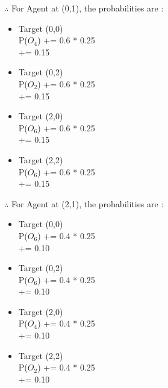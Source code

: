 \documentclass[10pt,letterpaper]{article}
\begin{document}
\noindent$\therefore$ For Agent at (0,1), the probabilities are :
\begin{itemize}
    \item Target (0,0)\\ \hspace*{23pt} P($O_4$) += 0.6 * 0.25\\ \hspace*{52pt} += 0.15
    \item Target (0,2)\\ \hspace*{23pt} P($O_2$) += 0.6 * 0.25\\ \hspace*{52pt} += 0.15
    \item Target (2,0)\\ \hspace*{23pt} P($O_6$) += 0.6 * 0.25\\ \hspace*{52pt} += 0.15
    \item Target (2,2)\\ \hspace*{23pt} P($O_6$) += 0.6 * 0.25\\ \hspace*{52pt} += 0.15
\end{itemize}

\noindent$\therefore$ For Agent at (2,1), the probabilities are :
\begin{itemize}
    \item Target (0,0)\\ \hspace*{23pt} P($O_6$) += 0.4 * 0.25\\ \hspace*{52pt} += 0.10
    \item Target (0,2)\\ \hspace*{23pt} P($O_6$) += 0.4 * 0.25\\ \hspace*{52pt} += 0.10
    \item Target (2,0)\\ \hspace*{23pt} P($O_4$) += 0.4 * 0.25\\ \hspace*{52pt} += 0.10
    \item Target (2,2)\\ \hspace*{23pt} P($O_2$) += 0.4 * 0.25\\ \hspace*{52pt} += 0.10
\end{itemize}
\end{document}
